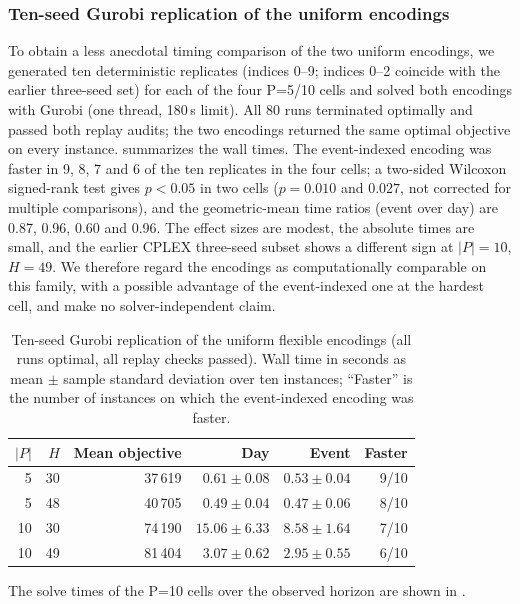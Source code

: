 \subsubsection{Ten-seed Gurobi replication of the uniform encodings}
\label{subsec:ten_seed}
To obtain a less anecdotal timing comparison of the two uniform encodings, we
generated ten deterministic replicates (indices 0--9; indices 0--2 coincide
with the earlier three-seed set) for each of the four P=5/10 cells and solved
both encodings with Gurobi (one thread, 180\,s limit). All 80 runs terminated
optimally and passed both replay audits; the two encodings returned the same
optimal objective on every instance.  summarizes the wall
times. The event-indexed encoding was faster in 9, 8, 7 and 6 of the ten
replicates in the four cells; a two-sided Wilcoxon signed-rank test gives
$p<0.05$ in two cells ($p=0.010$ and $0.027$, not corrected for multiple
comparisons), and the geometric-mean time ratios (event over day) are 0.87,
0.96, 0.60 and 0.96. The effect sizes are modest, the
absolute times are small, and the earlier CPLEX three-seed subset shows a
different sign at $|P|=10$, $H=49$. We therefore regard the encodings as
computationally comparable on this family, with a possible advantage of the
event-indexed one at the hardest cell, and make no solver-independent claim.

\begin{table}[t]
\centering\small
\caption{Ten-seed Gurobi replication of the uniform flexible encodings (all
runs optimal, all replay checks passed). Wall time in seconds as mean
$\pm$ sample standard deviation over ten instances; ``Faster'' is the number
of instances on which the event-indexed encoding was faster.}
\label{tab:ten_seed}
\begin{tabular}{rr r rr r}
\toprule
$|P|$ & $H$ & Mean objective & Day & Event & Faster \\
\midrule
5  & 30 & 37\,619 & $0.61\pm0.08$ & $0.53\pm0.04$ & 9/10 \\
5  & 48 & 40\,705 & $0.49\pm0.04$ & $0.47\pm0.06$ & 8/10 \\
10 & 30 & 74\,190 & $15.06\pm6.33$ & $8.58\pm1.64$ & 7/10 \\
10 & 49 & 81\,404 & $3.07\pm0.62$ & $2.95\pm0.55$ & 6/10 \\
\bottomrule
\end{tabular}
\end{table}

The solve times of the P=10 cells over the observed horizon are shown in
.

